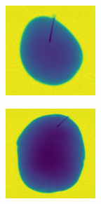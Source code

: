 \documentclass[11pt]{article}
\begin{document}
\begin{figure}[!h]
\begin{subfigure}[b]{0.22\textwidth}
         \caption{}
         \label{fig:metal_9}
     \end{subfigure}
     \hfill
     \begin{subfigure}[b]{0.22\textwidth}
         \centering
         \includegraphics[width=\textwidth]{figurer/potato_dataset/metal/metal_10.jpg}
         \caption{}
         \label{fig:metal_10}
     \end{subfigure}
     \hfill
     \begin{subfigure}[b]{0.22\textwidth}
         \centering
         \includegraphics[width=\textwidth]{figurer/potato_dataset/metal/metal_11.jpg}

\end{subfigure}
\end{figure}
\end{document}

